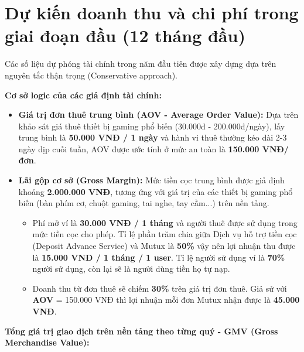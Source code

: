 \section{Dự kiến doanh thu và chi phí trong giai đoạn đầu (12 tháng đầu)}
Các số liệu dự phóng tài chính trong năm đầu tiên được xây dựng dựa trên nguyên tắc thận trọng (Conservative approach).

\textbf{Cơ sở logic của các giả định tài chính:}
\begin{itemize}
    \item \textbf{Giá trị đơn thuê trung bình (AOV - Average Order Value):} Dựa trên khảo sát giá thuê thiết bị gaming phổ biến (30.000đ - 200.000đ/ngày), lấy trung bình là \textbf{50.000 VNĐ / 1 ngày} và hành vi thuê thường kéo dài 2-3 ngày dịp cuối tuần, AOV được ước tính ở mức an toàn là \textbf{150.000 VNĐ/đơn}.
    \item \textbf{Lãi gộp cơ sở (Gross Margin):} Mức tiền cọc trung bình được giả định khoảng \textbf{2.000.000 VNĐ}, tương ứng với giá trị của các thiết bị gaming phổ biến (bàn phím cơ, chuột gaming, tai nghe, tay cầm...) trên nền tảng. 
    \begin{itemize}
        \item Phí mở ví là \textbf{30.000 VNĐ / 1 tháng} và người thuê được sử dụng trong mức tiền cọc cho phép. Tỉ lệ phần trăm chia giữa Dịch vụ hỗ trợ tiền cọc (Deposit Advance Service) và Mutux là \textbf{50\%} vậy nên lợi nhuận thu được là \textbf{15.000 VNĐ / 1 tháng / 1 user}. Tỉ lệ người sử dụng ví là \textbf{70\%} người sử dụng, còn lại sẽ là người dùng tiền họ tự nạp.
        \item Doanh thu từ đơn thuê sẽ chiếm \textbf{30\%} trên giá trị đơn thuê. Giả sử với \textbf{AOV} = 150.000 VNĐ thì lợi nhuận mỗi đơn Mutux nhận được là \textbf{45.000 VNĐ}.
    \end{itemize}
\end{itemize}

\textbf{Tổng giá trị giao dịch trên nền tảng theo từng quý - GMV (Gross Merchandise Value):}

